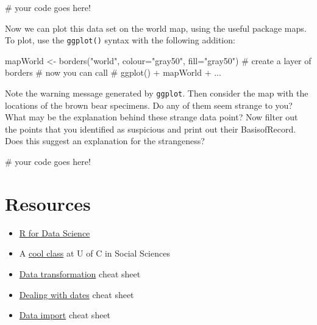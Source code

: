 \documentclass[
  letterpaper,
  DIV=11,
  numbers=noendperiod]{scrreprt}
\newenvironment{Shaded}{\begin{snugshade}}{\end{snugshade}}
\newcommand{\AttributeTok}[1]{\textcolor[rgb]{0.40,0.45,0.13}{#1}}
\newcommand{\CommentTok}[1]{\textcolor[rgb]{0.37,0.37,0.37}{#1}}
\newcommand{\FunctionTok}[1]{\textcolor[rgb]{0.28,0.35,0.67}{#1}}
\newcommand{\NormalTok}[1]{\textcolor[rgb]{0.00,0.23,0.31}{#1}}
\newcommand{\OtherTok}[1]{\textcolor[rgb]{0.00,0.23,0.31}{#1}}
\newcommand{\StringTok}[1]{\textcolor[rgb]{0.13,0.47,0.30}{#1}}
\providecommand{\tightlist}{%
  \setlength{\itemsep}{0pt}\setlength{\parskip}{0pt}}\usepackage{longtable,booktabs,array}
\begin{document}
\begin{Shaded}
\begin{Highlighting}[]
\CommentTok{\# your code goes here!}
\end{Highlighting}
\end{Shaded}

Now we can plot this data set on the world map, using the useful package
maps. To plot, use the \texttt{ggplot()} syntax with the following
addition:

\begin{Shaded}
\begin{Highlighting}[]
\NormalTok{mapWorld }\OtherTok{\textless{}{-}} \FunctionTok{borders}\NormalTok{(}\StringTok{"world"}\NormalTok{, }\AttributeTok{colour=}\StringTok{"gray50"}\NormalTok{, }\AttributeTok{fill=}\StringTok{"gray50"}\NormalTok{) }\CommentTok{\# create a layer of borders}
\CommentTok{\# now you can call }
\CommentTok{\# ggplot() + mapWorld + ...}
\end{Highlighting}
\end{Shaded}

Note the warning message generated by \texttt{ggplot}. Then consider the
map with the locations of the brown bear specimens. Do any of them seem
strange to you? What may be the explanation behind these strange data
point? Now filter out the points that you identified as suspicious and
print out their BasisofRecord. Does this suggest an explanation for the
strangeness?

\begin{Shaded}
\begin{Highlighting}[]
\CommentTok{\# your code goes here!}
\end{Highlighting}
\end{Shaded}

\hypertarget{resources-2}{%
\section{Resources}\label{resources-2}}

\begin{itemize}
\tightlist
\item
  \href{https://hackr.io/tutorial/r-for-data-science}{R for Data
  Science}
\item
  A \href{https://cfss.uchicago.edu/syllabus.html}{cool class} at U of C
  in Social Sciences
\item
  \href{https://github.com/rstudio/cheatsheets/raw/master/data-transformation.pdf}{Data
  transformation} cheat sheet
\item
  \href{https://github.com/rstudio/cheatsheets/raw/master/lubridate.pdf}{Dealing
  with dates} cheat sheet
\item
  \href{https://github.com/rstudio/cheatsheets/raw/master/data-import.pdf}{Data
  import} cheat sheet
\end{itemize}
\end{document}

